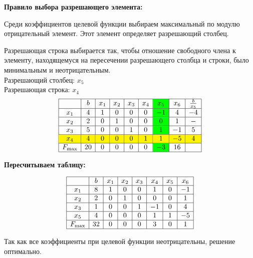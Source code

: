 \documentclass{article}
\begin{document}
\textbf{Правило выбора разрешающего элемента:}

Среди коэффициентов целевой функции выбираем максимальный по модулю отрицательный элемент. Этот элемент определяет разрешающий столбец.

Разрешающая строка выбирается так, чтобы отношение свободного члена к элементу, находящемуся на пересечении разрешающего столбца и строки, было минимальным и неотрицательным.\\
Разрешающий столбец: \( x_5 \)\\
Разрешающая строка: \( x_4 \)\\

\[
    \begin{array}{|c|c|c|c|c|c|>{\columncolor{green}}c|c|c|}
        \hline
                 & b  & x_1 & x_2 & x_3 & x_4 & x_5 & x_6 & \frac{b}{x_5} \\ \hline
        x_1      & 4  & 1   & 0   & 0   & 0   & -1  & 4   & -4            \\ \hline
        x_2      & 2  & 0   & 1   & 0   & 0   & 0   & 1   & -             \\ \hline
        x_3      & 5  & 0   & 0   & 1   & 0   & 1   & -1  & 5             \\ \hline
        \rowcolor{yellow}
        x_4      & 4  & 0   & 0   & 0   & 1   & 1   & -5  & 4             \\ \hline
        F_{\max} & 20 & 0   & 0   & 0   & 0   & -3  & 16  &               \\ \hline
    \end{array}
\]

\textbf{Пересчитываем таблицу:}

\[
    \begin{array}{|c|c|c|c|c|c|c|c|}
        \hline
                 & b  & x_1 & x_2 & x_3 & x_4 & x_5 & x_6 \\ \hline
        x_1      & 8  & 1   & 0   & 0   & 1   & 0   & -1  \\ \hline
        x_2      & 2  & 0   & 1   & 0   & 0   & 0   & 1   \\ \hline
        x_3      & 1  & 0   & 0   & 1   & -1  & 0   & 4   \\ \hline
        x_5      & 4  & 0   & 0   & 0   & 1   & 1   & -5  \\ \hline
        F_{\max} & 32 & 0   & 0   & 0   & 3   & 0   & 1   \\ \hline
    \end{array}
\]

Так как все коэффициенты при целевой функции неотрицательны, решение оптимально.
\end{document}

